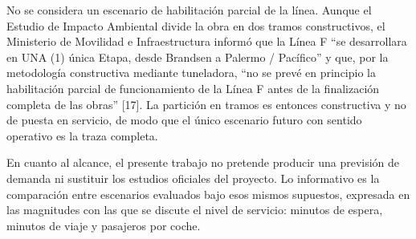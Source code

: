 \documentclass{article}
\begin{document}
No se considera un escenario de habilitación parcial de la línea. Aunque el Estudio de Impacto Ambiental
divide la obra en dos tramos constructivos, el Ministerio de Movilidad e Infraestructura informó que la
Línea F ``se desarrollara en UNA (1) única Etapa, desde Brandsen a Palermo / Pacífico'' y que, por la
metodología constructiva mediante tuneladora, ``no se prevé en principio la habilitación parcial de
funcionamiento de la Línea F antes de la finalización completa de las obras'' [17]. La partición en tramos
es entonces constructiva y no de puesta en servicio, de modo que el único escenario futuro con sentido
operativo es la traza completa.

En cuanto al alcance, el presente trabajo no pretende producir una previsión de demanda ni sustituir los
estudios oficiales del proyecto. Lo informativo es la comparación entre escenarios evaluados bajo esos
mismos supuestos, expresada en las magnitudes con las que se discute el nivel de servicio: minutos de
espera, minutos de viaje y pasajeros por coche.

\end{document}
